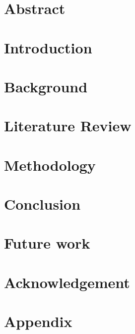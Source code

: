 \documentclass[twocolumn]{article}
\begin{document}
    \begin{titlepage}
        \tableofcontents
    \end{titlepage}


    \section*{Abstract}\label{sec:abstract}
    

    \section{Introduction}\label{sec:introduction}
    

    \section{Background}\label{sec:background}
    

    \section{Literature Review}\label{sec:literature-review}
    

    \section{Methodology}\label{sec:methodology}
    

    \section{Conclusion}\label{sec:conclusion}
    

    \section{Future work}\label{sec:futurework}
    

    \section{Acknowledgement}\label{sec:acknowledgement}
    

    \printbibliography

    \onecolumn
    \appendix
    \section{Appendix}\label{sec:appendix}
    
\end{document}
